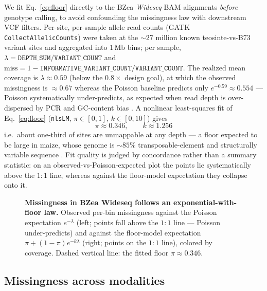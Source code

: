 \documentclass[11pt]{article}
\newcommand{\miss}{\mathrm{miss}}
\newcommand{\cov}{\lambda}                          %
\begin{document}
We fit Eq.~\eqref{eq:floor} directly to the BZea \emph{Wideseq} BAM alignments
\emph{before} genotype calling, to avoid confounding the missingness law with
downstream VCF filters. Per-site, per-sample allele read counts
(GATK \texttt{CollectAllelicCounts}) were taken at the ${\sim}27$ million known
teosinte-vs-B73 variant sites and aggregated into $1$\,Mb bins; per sample,
$\cov = \texttt{DEPTH\_SUM}/\texttt{VARIANT\_COUNT}$ and
$\miss = 1 - \texttt{INFORMATIVE\_VARIANT\_COUNT}/\texttt{VARIANT\_COUNT}$. The
realized mean coverage is $\cov\approx0.59$ (below the $0.8\times$ design goal),
at which the observed missingness is $\approx0.67$ whereas the Poisson baseline
predicts only $e^{-0.59}\approx0.554$ --- Poisson systematically under-predicts,
as expected when read depth is over-dispersed by PCR and GC-content bias
\citep{benjamini_speed_2012,ross_2013}.
A nonlinear least-squares fit of Eq.~\eqref{eq:floor}
(\texttt{nlsLM}, $\pi\in[0,1]$, $k\in[0,10]$) gives
\begin{equation}
\pi \approx 0.346,
\qquad
k \approx 1.256
\label{eq:floor-fit-bzea}
\end{equation}
i.e.\ about one-third of sites are unmappable at any depth --- a floor expected to
be large in maize, whose genome is ${\sim}85\%$ transposable-element and
structurally variable sequence \citep{schnable_2009,gui_2022}. Fit quality is judged
by concordance rather than a summary statistic: on an
observed-vs-Poisson-expected plot the points lie systematically above the $1{:}1$
line, whereas against the floor-model expectation they collapse onto it.
\begin{figure}[t]
\centering
\caption{\textbf{Missingness in BZea Wideseq follows an exponential-with-floor
law.} Observed per-bin missingness against the Poisson expectation
$e^{-\cov}$ (left; points fall above the $1{:}1$ line --- Poisson under-predicts)
and against the floor-model expectation $\pi+(1-\pi)e^{-k\cov}$ (right; points on
the $1{:}1$ line), colored by coverage. Dashed vertical line: the fitted floor
$\pi\approx0.346$.}
\label{fig:floor-fit}
\end{figure}

\subsection{Missingness across modalities}
\label{sec:model-comparison}
\end{document}
